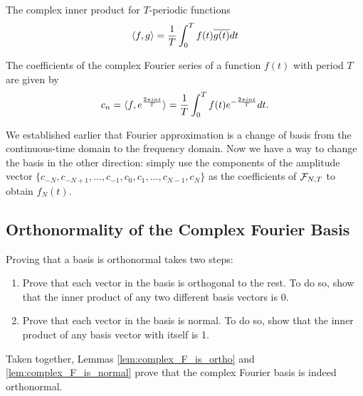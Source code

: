 \begin{definition}{The complex inner product for $T$-periodic functions}
    $$\langle f,g \rangle = \frac{1}{T} \int_0^T f(t)\overline{g(t)}dt$$
    \label{defn:complex_innerprod}
\end{definition}

\begin{definition}{The coefficients of the complex Fourier series of a function $f(t)$ with period $T$ are given by}
    $$c_n = \langle f,e^{\frac{2 \pi i nt}{T}} \rangle = \frac{1}{T} \int_0^T f(t)e^{-\frac{2\pi int}{T}}dt.$$
    \label{defn:complex_F_coeffs}
\end{definition}

\par We established earlier that Fourier approximation is a change of basis from the continuous-time domain to the frequency domain. Now we have a way to change the basis in the other direction: simply use the components of the amplitude vector $\{c_{-N},c_{-N+1},...,c_{-1},c_0,c_1,...,c_{N-1},c_N\}$ as the coefficients of $\mathcal{F}_{N,T}$ to obtain $f_N(t)$.

\subsection{Orthonormality of the Complex Fourier Basis}

\par \indentt Proving that a basis is orthonormal takes two steps:

\begin{enumerate}
    \item Prove that each vector in the basis is orthogonal to the rest. To do so, show that the inner product of any two different basis vectors is 0.
    \item Prove that each vector in the basis is normal. To do so, show that the inner product of any basis vector with itself is 1.
\end{enumerate}

\par Taken together, Lemmas \ref{lem:complex_F_is_ortho} and \ref{lem:complex_F_is_normal} prove that the complex Fourier basis is indeed orthonormal.\\

